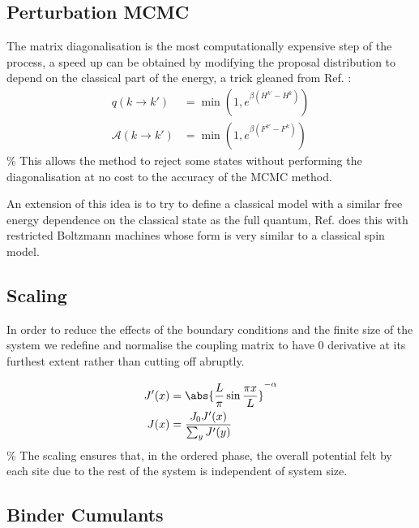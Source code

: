 \hypertarget{perturbation-mcmc}{%
\subsection{Perturbation MCMC}\label{perturbation-mcmc}}

The matrix diagonalisation is the most computationally expensive step of the process, a speed up can be obtained by modifying the proposal distribution to depend on the classical part of the energy, a trick gleaned from Ref. \autocite{krauthIntroductionMonteCarlo1998}: \[
\begin{aligned}
q(k \to k') &= \min\left(1, e^{\beta (H^{k'} - H^k)}\right) \\
\mathcal{A}(k \to k') &= \min\left(1, e^{\beta(F^{k'}- F^k)}\right)
\end{aligned}\] \% This allows the method to reject some states without performing the diagonalisation at no cost to the accuracy of the MCMC method.

An extension of this idea is to try to define a classical model with a similar free energy dependence on the classical state as the full quantum, Ref. \autocite{huangAcceleratedMonteCarlo2017} does this with restricted Boltzmann machines whose form is very similar to a classical spin model.

\hypertarget{scaling}{%
\subsection{Scaling}\label{scaling}}

In order to reduce the effects of the boundary conditions and the finite size of the system we redefine and normalise the coupling matrix to have 0 derivative at its furthest extent rather than cutting off abruptly.

\[
\begin{aligned}
J'(x) &= \abs{\frac{L}{\pi}\sin \frac{\pi x}{L}}^{-\alpha} \\
J(x) &= \frac{J_0 J'(x)}{\sum_y J'(y)}
\end{aligned}\] \% The scaling ensures that, in the ordered phase, the overall potential felt by each site due to the rest of the system is independent of system size.

\hypertarget{binder-cumulants}{%
\subsection{Binder Cumulants}\label{binder-cumulants}}

